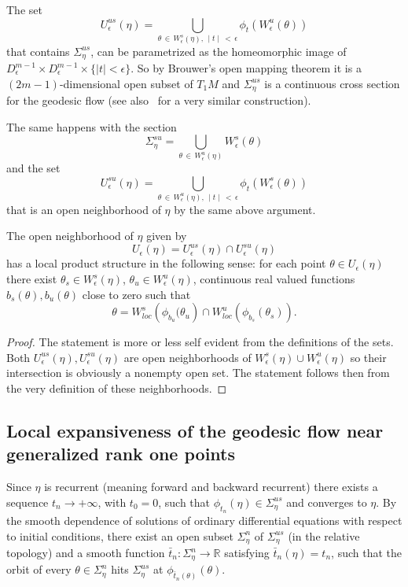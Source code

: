 \documentclass[AHL,Unicode,longabstracts,published]{cedram}
\newcommand{\bbR}{\mathbb{R}}
\begin{document}
The set
\[
U_{\epsilon}^{us}(\eta) = \bigcup_{\theta\,\in\,W^{s}_{\epsilon}(\eta),\,\mid t \mid\,<\,\epsilon} \phi_{t}\left(W^{u}_{\epsilon}(\theta)\right)
\]
that contains $\Sigma_{\eta}^{us}$, can be parametrized as the homeomorphic image of $D^{m-1}_{\epsilon} \times D^{m-1}_{\epsilon}\times\{ \mid t \mid <\epsilon\} $. So by Brouwer's open mapping theorem it is a $(2m-1)$-dimensional open subset of $T_{1}M$ and $\Sigma_{\eta}^{us}$ is a continuous cross section for the geodesic flow (see also~\cite{kn:Ruggiero-expansive} for a very similar construction).

The same happens with the section
\[
\Sigma_{\eta}^{su} = \bigcup_{\theta\,\in\,W^{u}_{\epsilon}(\eta)} W^{s}_{\epsilon}(\theta)
\]
and the set
\[
U_{\epsilon}^{su}(\eta) = \bigcup_{\theta\,\in\,W^{u}_{\epsilon}(\eta),\,\mid t \mid\,<\,\epsilon} \phi_{t}\left(W^{s}_{\epsilon}(\theta)\right)
\]
that is an open neighborhood of $\eta$ by the same above argument.


\begin{lemm}\label{product-structure}
The open neighborhood of $\eta$ given by
\[
U_{\epsilon}(\eta)= U_{\epsilon}^{us}(\eta) \cap U_{\epsilon}^{su}(\eta)
\]
has a local product structure in the following sense: for each point $\theta \in U_{\epsilon}(\eta)$ there exist $\theta_{s} \in W^{s}_{\epsilon}(\eta)$, $\theta_{u} \in W^{u}_{\epsilon}(\eta)$, continuous real valued functions $b_{s}(\theta), b_{u}(\theta)$ close to zero such that
\[
\theta = W^{s}_{loc}\left(\phi_{b_{u}}(\theta_{u}\right) \cap W^{u}_{loc}\left(\phi_{b_{s}}(\theta_{s})\right).
\]
\end{lemm}

\begin{proof}
The statement is more or less self evident from the definitions of the sets. Both $U_{\epsilon}^{us}(\eta), U_{\epsilon}^{su}(\eta)$ are open neighborhoods of $ W^{s}_{\epsilon}(\eta) \cup W^{u}_{\epsilon}(\eta)$ so their intersection is obviously a nonempty open set. The statement follows then from the very definition of these neighborhoods.
\end{proof}


\subsection{Local expansiveness of the geodesic flow near generalized rank one points}

Since $\eta$ is recurrent (meaning forward and backward recurrent) there exists a sequence $t_{n} \rightarrow +\infty$, with $t_{0}=0$, such that $\phi_{t_{n}}(\eta) \in \Sigma_{\eta}^{us}$ and converges to $\eta$. By the smooth dependence of solutions of ordinary differential equations with respect to initial conditions, there exist an open subset $\Sigma_{\eta}^{n}$ of $\Sigma_{\eta}^{us}$ (in the relative topology) and a smooth function $\bar{t}_{n} : \Sigma_{\eta}^{n} \longrightarrow \bbR$ satisfying $\bar{t}_{n}(\eta) = t_{n}$, such that the orbit of every $\theta \in \Sigma_{\eta}^{n}$ hits $\Sigma_{\eta}^{us}$ at $\phi_{\bar{t}_{n}(\theta)}(\theta)$.
\end{document}
